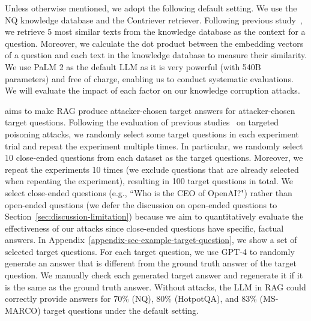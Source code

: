 Unless otherwise mentioned, we adopt the following default setting. We use the NQ knowledge database and the Contriever retriever. 
Following previous study~\cite{lewis2020retrieval}, we retrieve $5$ most similar texts from the knowledge database as the context for a question. Moreover, we calculate the dot product between the embedding vectors of a question and each text in the knowledge database to measure their similarity.  We use PaLM 2 as the default LLM as it is very powerful (with 540B parameters) and free of charge, enabling us to conduct systematic evaluations. We will evaluate the impact of each factor on our knowledge corruption attacks. 

 {\name} aims to make RAG produce attacker-chosen target answers for attacker-chosen target questions. Following the evaluation of previous studies~\cite{shafahi2018poison,carlini2021poisoning,carlini2021poisoningsemi,liu2022poisonedencoder} on targeted poisoning attacks, we randomly select some target questions in each experiment trial and repeat the experiment multiple times.
In particular, we randomly select $10$ close-ended questions from each dataset 
as the target questions. Moreover, we repeat the experiments 10 times (we exclude questions that are already selected when repeating the experiment), resulting in 100 target questions in total. 
We select close-ended questions (e.g., ``Who is the CEO of OpenAI?") rather than open-ended questions (we defer the discussion on open-ended questions to Section~\ref{sec:discussion-limitation}) because we aim to quantitatively evaluate the effectiveness of our attacks since close-ended questions have specific, factual answers. In Appendix~\ref{appendix-sec-example-target-question}, we show a set of selected target questions. 
For each target question, we use GPT-4 to randomly generate an answer that is different from the ground truth answer of the target question. We manually check each generated target answer and regenerate it if it is the same as the ground truth answer. 
Without attacks, the LLM in RAG could correctly provide answers for 70\% (NQ), 80\% (HotpotQA), and 83\% (MS-MARCO) target questions under the default setting.




